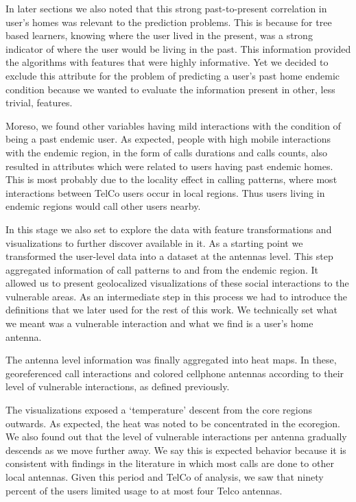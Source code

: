 In later sections we also noted that this strong past-to-present correlation in user's homes was relevant to the prediction problems.
This is because for tree based learners, knowing where the user lived in the present, was a strong indicator of where the user would be living in the past.
This information provided the algorithms with features that were highly informative.
Yet we decided to exclude this attribute for the problem of predicting a user's past home endemic condition because we wanted to evaluate the information present in other, less trivial, features.

Moreso, we found other variables having mild interactions with the condition of being a past endemic user.
As expected, people with high mobile interactions with the endemic region, in the form of calls durations and calls counts, also resulted in attributes which were related to users having past endemic homes.
This is most probably due to the locality effect in calling patterns, where most interactions between TelCo users occur in local regions.
Thus users living in endemic regions would call other users nearby.



In this stage we also set to explore the data with feature transformations and visualizations to further discover available in it. %
As a starting point we transformed the user-level data into a dataset at the antennas level.
This step aggregated information of call patterns to and from the endemic region.
It allowed us to present geolocalized visualizations of these social interactions to the vulnerable areas.
As an intermediate step in this process we had to introduce the definitions that we later used for the rest of this work.
We technically set what we meant was a vulnerable interaction and what we find is a user's home antenna.


The antenna level information was finally aggregated into heat maps.
In these, georeferenced call interactions and colored cellphone antennas according to their level of vulnerable interactions, as defined previously.

The visualizations exposed a `temperature' descent from the core regions outwards.
As expected, the heat was noted to be concentrated in the ecoregion.
We also found out that the level of vulnerable interactions per antenna gradually descends as we move further away.
We say this is expected behavior because it is consistent with findings in the literature in which most calls are done to other local antennas. %
Given this period and TelCo of analysis, we saw that ninety percent of the users limited usage to at most four Telco antennas.

